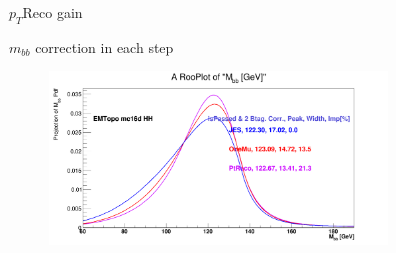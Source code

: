 \begin{frame}{$p_T$Reco gain}
\begin{figure}
    \centering
\end{figure}
\end{frame}

\begin{frame}{$m_{bb}$ correction in each step}
\begin{figure}
    \centering
    \includegraphics[width=0.8\textwidth]{BackUp/Part3/Img/mbb_PtReco_HH.png}
\end{figure}    
\end{frame}

